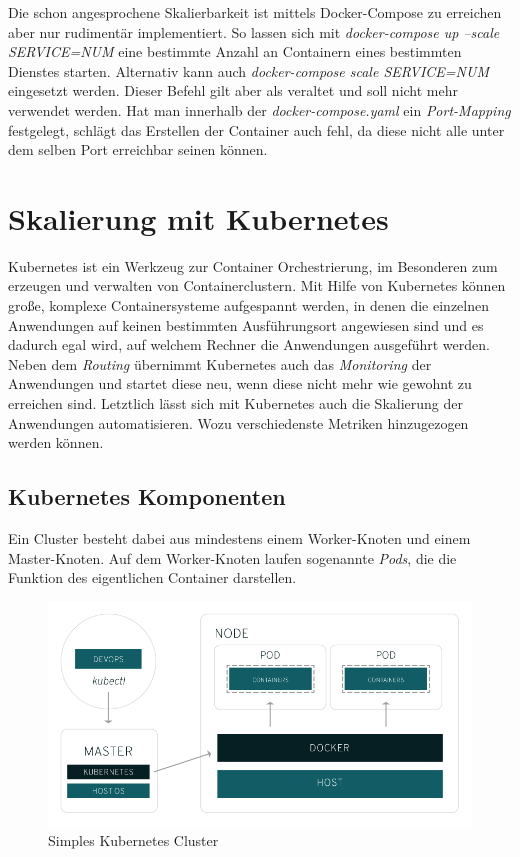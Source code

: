 \documentclass[12pt,a4paper]{scrartcl}
\begin{document}
Die schon angesprochene Skalierbarkeit ist mittels Docker-Compose zu erreichen aber nur rudimentär implementiert. So lassen sich mit \emph{docker-compose up --scale SERVICE=NUM} eine bestimmte Anzahl an Containern eines bestimmten Dienstes starten. Alternativ kann auch \emph{docker-compose scale SERVICE=NUM} eingesetzt werden. Dieser Befehl gilt aber als veraltet und soll nicht mehr verwendet werden. Hat man innerhalb der \emph{docker-compose.yaml} ein \emph{Port-Mapping} festgelegt, schlägt das Erstellen der Container auch fehl, da diese nicht alle unter dem selben Port erreichbar seinen können.

\section{Skalierung mit Kubernetes} \label{kubernetes}

Kubernetes ist ein Werkzeug zur Container Orchestrierung, im Besonderen zum erzeugen und verwalten von Containerclustern. Mit Hilfe von Kubernetes können große, komplexe Containersysteme aufgespannt werden, in denen die einzelnen Anwendungen auf keinen bestimmten Ausführungsort angewiesen sind und es dadurch egal wird, auf welchem Rechner die Anwendungen ausgeführt werden. Neben dem \emph{Routing} übernimmt Kubernetes auch das \emph{Monitoring} der Anwendungen und startet diese neu, wenn diese nicht mehr wie gewohnt zu erreichen sind. Letztlich lässt sich mit Kubernetes auch die Skalierung der Anwendungen automatisieren. Wozu verschiedenste Metriken hinzugezogen werden können. 

\subsection{Kubernetes Komponenten}

Ein Cluster besteht dabei aus mindestens einem Worker-Knoten und einem Master-Knoten. Auf dem Worker-Knoten laufen sogenannte \emph{Pods}, die die Funktion des eigentlichen Container darstellen. 

\begin{figure}[h!]
	\centering
	\includegraphics[scale=0.5]{KubeSimpleCluster.png}
	\caption[https://www.redhat.com/de/topics/containers/what-is-kubernetes]{Simples Kubernetes Cluster}
\end{figure}
\end{document}
